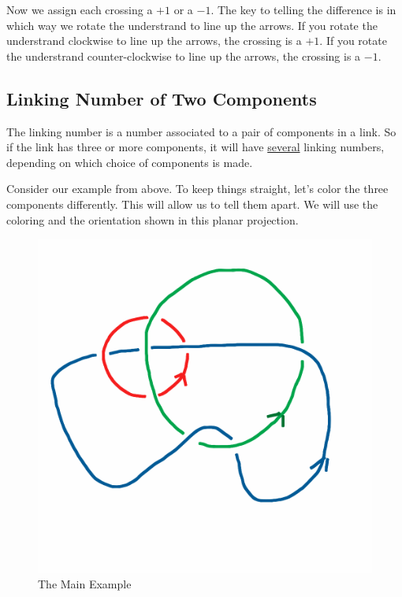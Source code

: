 \documentclass[12pt,letterpaper]{article}
\theoremstyle{definition}
\begin{document}
Now we assign each crossing a $+1$ or a $-1$.
The key to telling the difference is in which way we rotate the understrand to line up the arrows.
If you rotate the understrand clockwise to line up the arrows, the crossing is a $+1$.
If you rotate the understrand counter-clockwise to line up the arrows, the crossing is a $-1$.

\subsection*{Linking Number of Two Components}

The linking number is a number associated to a pair of components in a link. 
So if the link has three or more components, it will have \underline{several} linking numbers, depending on which choice of components is made.

Consider our example from above.
To keep things straight, let's color the three components differently.
This will allow us to tell them apart.
We will use the coloring and the orientation shown in this planar projection.

\begin{figure}[h]
    \centering
    \includegraphics[width=.35\textwidth]{knotpics/mainex.png}
    \caption{The Main Example}
\end{figure}
\end{document}
